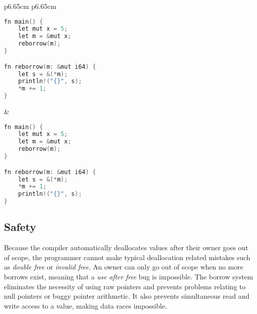 \noindent
\begin{tabular}{p{6.65cm} p{6.65cm}}
    \begin{lstlisting}[language=C,frame=single,caption=Reborrow Example,label=code:reborrow_semantics]
fn main() {
    let mut x = 5;
    let m = &mut x;
    reborrow(m);
}

fn reborrow(m: &mut i64) {
    let s = &(*m);
    println!("{}", s);
    *m += 1;
}
    \end{lstlisting}

    &

    \begin{lstlisting}[language=C,frame=single,caption=Wrong Example,label=code:reborrow_semantics_wrong]
fn main() {
    let mut x = 5;
    let m = &mut x;
    reborrow(m);
}

fn reborrow(m: &mut i64) {
    let s = &(*m);
    *m += 1;
    println!("{}", s);
}
    \end{lstlisting}
\end{tabular}

\subsection{Safety}
Because the compiler automatically deallocates values after their owner goes out of scope, the programmer cannot make typical deallocation related mistakes such as \textit{double free} or \textit{invalid free}. An owner can only go out of scope when no more borrows exist, meaning that a \textit{use after free} bug is impossible. The borrow system eliminates the necessity of using raw pointers and prevents problems relating to null pointers or buggy pointer arithmetic. It also prevents simultaneous read and write access to a value, making data races impossible.

